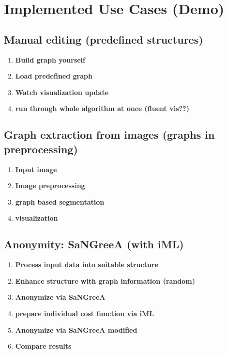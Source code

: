 \chapter{Implemented Use Cases (Demo)}
\label{ch:use_cases}


\section{Manual editing (predefined structures)}
\label{sect:manual_editing}

	\begin{enumerate}
		\item \textbf{Build graph yourself}
		\item \textbf{Load predefined graph}
		\item \textbf{Watch visualization update}
		\item \textbf{run through whole algorithm at once (fluent vis??)}
	\end{enumerate}


\section{Graph extraction from images (graphs in preprocessing)}
\label{sect:graph_ext}

	\begin{enumerate}
		\item \textbf{Input image}
		\item \textbf{Image preprocessing}
		\item \textbf{graph based segmentation}
		\item \textbf{visualization}
	\end{enumerate}


\section{Anonymity: SaNGreeA (with iML)}
\label{sect:anonymization}

	\begin{enumerate}
		\item \textbf{Process input data into suitable structure}
		\item \textbf{Enhance structure with graph information (random)}
		\item \textbf{Anonymize via SaNGreeA}
		\item \textbf{prepare individual cost function via iML}
		\item \textbf{Anonymize via SaNGreeA modified}
		\item \textbf{Compare results}
	\end{enumerate}



